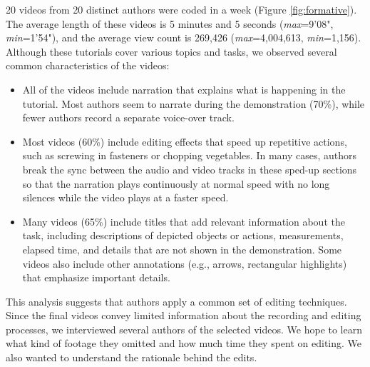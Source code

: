 20 videos from 20 distinct authors were coded in a week (Figure \ref{fig:formative}).
The average length of these videos is 5 minutes and 5 seconds (\emph{max}=9'08",
\emph{min}=1'54"), and the average view count is 269,426
(\emph{max}=4,004,613, \emph{min}=1,156). Although these tutorials
cover various topics and tasks, we observed several common
characteristics of the videos:

\begin{itemize}
  \setlength{\itemsep}{0pt}

\item {} All of the videos include narration that
  explains what is happening in the tutorial. Most authors seem to
  narrate during the demonstration (70\%), while fewer authors record a
  separate voice-over track.

\item {} Most videos (60\%) include editing
  effects that speed up repetitive actions, such as screwing in
  fasteners or chopping vegetables. In many cases, authors break the
  sync between the audio and video tracks in these sped-up sections so
  that the narration plays continuously at normal speed with no long
  silences while the video plays at a faster speed.

\item {} Many videos (65\%) include titles
  that add relevant information about the task, including descriptions
  of depicted objects or actions, measurements, elapsed time, and
  details that are not shown in the demonstration. Some videos also
  include other annotations (e.g., arrows, rectangular highlights)
  that emphasize important details.

\end{itemize}

This analysis suggests that authors apply a common set of editing
techniques. Since the final videos convey limited information
about the recording and editing processes, we
interviewed several authors of the selected videos.
We hope to learn what kind of footage they omitted and how much time they spent on editing. We also wanted to understand the rationale behind the edits.


